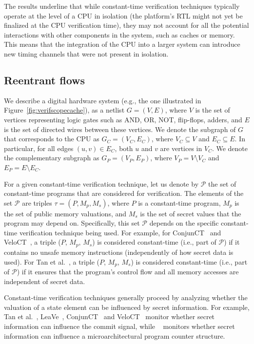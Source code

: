 The results underline that while constant-time verification techniques typically operate at the level of a CPU in isolation (the platform's RTL might not yet be finalized at the CPU verification time), they may not account for all the potential interactions with other components in the system, such as caches or memory.
This means that the integration of the CPU into a larger system can introduce new timing channels that were not present in isolation.

\subsection{Reentrant flows}

We describe a digital hardware system (e.g., the one illustrated in Figure~\ref{fig:verifscopecache}), as a netlist $G = (V, E)$, where $V$ is the set of vertices representing logic gates such as AND, OR, NOT, flip-flops, adders, and $E$ is the set of directed wires between these vertices.
We denote the subgraph of $G$ that corresponds to the CPU as $G_C = (V_C, E_C)$, where $V_C \subseteq V$ and $E_C \subseteq E$.
In particular, for all edges $(u, v) \in E_C$, both $u$ and $v$ are vertices in $V_C$.
We denote the complementary subgraph as $G_{P} = (V_{P}, E_{P})$, where $V_{P} = V \setminus V_C$ and $E_{P} = E \setminus E_C$.

For a given constant-time verification technique, let us denote by $\mathcal{P}$ the set of constant-time programs that are considered for verification.
The elements of the set $\mathcal{P}$ are triples $\tau = (P, M_p, M_s)$, where $P$ is a constant-time program, $M_p$ is the set of public memory valuations, and $M_s$ is the set of secret values that the program may depend on.
Specifically, this set $\mathcal{P}$ depends on the specific constant-time verification technique being used.
For example, for ConjunCT~\cite{dinesh2024conjunct} and VeloCT~\cite{dinesh2025h}, a triple ($P$, $M_p$, $M_s$) is considered constant-time (i.e., part of $\mathcal{P}$) if it contains no unsafe memory instructions (independently of how secret data is used).
For Tan et al.~\cite{tan2025contractshadowlogic}, a triple ($P$, $M_p$, $M_s$) is considered constant-time (i.e., part of $\mathcal{P}$) if it ensures that the program's control flow and all memory accesses are independent of secret data.

Constant-time verification techniques generally proceed by analyzing whether the valuation of a state element can be influenced by secret information.
For example, Tan et al.~\cite{tan2025contractshadowlogic}, LeaVe~\cite{wang2023specification}, ConjunCT~\cite{dinesh2024conjunct} and VeloCT~\cite{dinesh2025h} monitor whether secret information can influence the commit signal, while \ucfi~\cite{ceesay2024mucfi} monitors whether secret information can influence a microarchitectural program counter structure.

